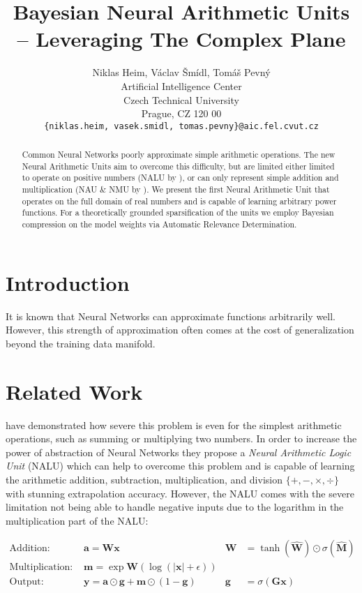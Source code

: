 \documentclass[9pt]{article}
\title{Bayesian Neural Arithmetic Units -- Leveraging The Complex Plane}
\author{
  Niklas Heim,
  V\'aclav \v Sm\'idl,
  Tom\'a\v s Pevn\'y \\
  Artificial Intelligence Center\\
  Czech Technical University\\
  Prague, CZ 120 00\\
  \texttt{\{niklas.heim, vasek.smidl, tomas.pevny\}@aic.fel.cvut.cz}\\
}
\begin{document}
\maketitle

\begin{abstract}
  Common Neural Networks poorly approximate simple arithmetic operations.  The
  new Neural Arithmetic Units aim to overcome this difficulty, but are limited
  either limited to operate on positive numbers (NALU by
  \citet{trask_neural_2018}), or can only represent simple addition and
  multiplication (NAU \& NMU by \citet{madsen_neural_2020}).
  We present the first Neural Arithmetic Unit that operates on the full domain
  of real numbers and is capable of learning arbitrary power functions.
  For a theoretically grounded sparsification of the units we employ Bayesian
  compression on the model weights via Automatic Relevance Determination.
\end{abstract}


\section{Introduction}%
\label{sec:introduction}


It is known that Neural Networks can approximate functions arbitrarily
well.  However, this strength of approximation
often comes at the cost of generalization beyond the training data manifold.

\section{Related Work}%
\label{sec:related_work}

\citet{trask_neural_2018} have demonstrated how severe this problem is even for
the simplest arithmetic operations, such as summing or multiplying two numbers.
In order to increase the power of abstraction of Neural Networks they propose a
\emph{Neural Arithmetic Logic Unit} (NALU) which can help to overcome this
problem \cite{trask_neural_2018} and is capable of learning the arithmetic
addition, subtraction, multiplication, and division
$\{+,-,\times,\div\}$ with stunning extrapolation accuracy.  However,
the NALU comes with the severe limitation not being able to handle negative
inputs due to the logarithm in the multiplication part of the NALU:

\begin{align}
  \label{eq:nalu_add}
  \text{Addition: }       & \bm a = \bm W \bm x
                          & \bm W& = \tanh(\hat{\bm W}) \odot \sigma(\hat{\bm M}) \\
  \label{eq:nalu_mult}
  \text{Multiplication: } & \bm m = \exp \bm W(\log(|\bm x|+\epsilon)) & &\\
  \text{Output: }         & \bm y = \bm a \odot \bm g + \bm m \odot (1-\bm g) 
                          & \bm g& = \sigma(\bm G\bm x)
\end{align}
\end{document}
